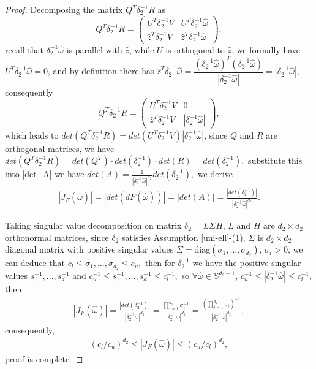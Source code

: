 \documentclass[11pt,reqno]{amsart}
\numberwithin{equation}{section}
\newcommand{\s}{\mathbb{S}}
\newcommand{\om}{\omega}
\newcommand{\de}{\delta}
\begin{document}
\begin{proof}
Decomposing the matrix $Q^T\de_{2}^{-1}R$ as 
 $$Q^T\de_{2}^{-1}R=
 \begin{pmatrix}
 	U^T\de_{2}^{-1}V & U^T\de_{2}^{-1}\hat{\om} \\
 	\hat{z}^T\de_{2}^{-1}V & \hat{z}^T\de_{2}^{-1}\hat{\om} 
 \end{pmatrix},
 $$
recall that $\de_{2}^{-1}\hat{\om}$ is parallel with $\hat{z}$, while $U$ is orthogonal to $\hat{z}$, we formally have $U^T\de_{2}^{-1}\hat{\om}=0$, and by definition there has $\hat{z}^T\de_{2}^{-1}\hat{\om}=\dfrac{(\de_{2}^{-1}\hat{\om})^T(\de_{2}^{-1}\hat{\om})}{|\de_{2}^{-1}\hat{\om}|}=|\de_{2}^{-1}\hat{\om}|$, consequently
$$Q^T\de_{2}^{-1}R=
 \begin{pmatrix}
 	U^T\de_{2}^{-1}V & 0 \\
 	\hat{z}^T\de_{2}^{-1}V & |\de_{2}^{-1}\hat{\om}|
 \end{pmatrix},
 $$
which leads to $det(Q^T\de_{2}^{-1}R)=det(U^T\de^{-1}_2V )|\de_{2}^{-1}\hat{\om}|$, since $Q$ and $R$ are orthogonal matrices, we have $det(Q^T\de_{2}^{-1}R)=det(Q^T)\cdot det(\de_{2}^{-1})\cdot det(R)=det(\de_{2}^{-1}),$ substitute this into \eqref{det_A} we have
$
	det(A)=\frac{1}{|\de_{2}^{-1}\hat{\om}|^{d_2}}det(\de_{2}^{-1}),
$
we derive 
\begin{align*}
	|J_F(\hat{\om})|=|det(dF(\hat{\om}))|=|det(A)|=\frac{|det(\de_{2}^{-1})|}{|\de_{2}^{-1}\hat{\om}|^{d_2}}.
\end{align*}

Taking singular value decomposition on matrix $\de_2=L\Sigma H$, $L$ and $H$ are $d_2\times d_2$ orthonormal matrices, since $\delta_{2}$ satisfies Assumption \ref{uni-ell}-(1), $\Sigma$ is $d_2\times d_2$ diagonal matrix with positive ‌singular values‌ $\Sigma=\text{diag}(\sigma_1,\dots,\sigma_{d_2})$, $\sigma_i>0$, we can deduce that 
$
c_l\le \sigma_1,\dots,\sigma_{d_2}\le c_u,
$
then for $\delta_{2}^{-1}$ we have the positive ‌singular values‌ $s_1^{-1},\dots, s_d^{-1}$ and
$c_u^{-1}\le s_1^{-1},\dots, s_d^{-1}\le c_l^{-1},$
so $\forall \hat{\om}\in \s^{d_2-1}$,
$c_u^{-1}\le |\de_{2}^{-1}\hat{\om}|\le c_l^{-1},$
then 
\begin{align*}
|J_F(\hat{\om})|=\frac{|det(\de_{2}^{-1})|}{|\de_{2}^{-1}\hat{\om}|^{d_2}}=\frac{\prod_{i=1}^{d_2}\sigma_i^{-1}}{|\de_{2}^{-1}\hat{\om}|^{d_2}}=\frac{(\prod_{i=1}^{d_2} \sigma_i)^{-1}}{|\de_{2}^{-1}\hat{\om}|^{d_2}}, 
\end{align*}
consequently, 
\begin{align*}
	\left(c_l/c_u\right)^{d_2}	\leq |J_F(\hat{\om})|\leq \left(c_u/c_l \right)^{d_2},
\end{align*}
proof is complete.
\end{proof}
\end{document}
